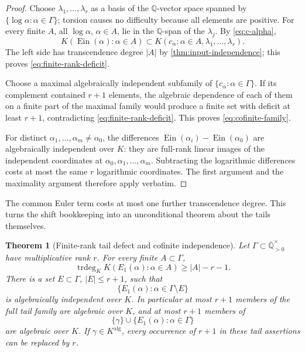 \documentclass[11pt]{article}
\newtheorem{theorem}{Theorem}[section]
\theoremstyle{definition}
\theoremstyle{remark}
\newcommand{\Q}{\mathbb Q}
\newcommand{\Qbar}{\overline{\mathbb Q}}
\newcommand{\Ein}{\operatorname{Ein}}
\newcommand{\trdeg}{\operatorname{trdeg}}
\begin{document}
\begin{proof}
Choose \(\lambda_1,\ldots,\lambda_r\) as a basis of the \(\Q\)-vector space
spanned by \(\{\log\alpha:\alpha\in\Gamma\}\); torsion causes no difficulty
because all elements are positive.  For every finite \(A\), all
\(\log\alpha\), \(\alpha\in A\), lie in the \(\Q\)-span of the
\(\lambda_j\).  By \eqref{eq:c-alpha},
\[
 K(\Ein(\alpha):\alpha\in A)
 \subset K(c_\alpha:\alpha\in A,\lambda_1,\ldots,\lambda_r).
\]
The left side has transcendence degree \(|A|\) by
\cref{thm:input-independence}; this proves \eqref{eq:finite-rank-deficit}.

Choose a maximal algebraically independent subfamily of
\(\{c_\alpha:\alpha\in\Gamma\}\).  If its complement contained
\(r+1\) elements, the algebraic dependence of each of them on a finite part
of the maximal family would produce a finite set with deficit at least
\(r+1\), contradicting \eqref{eq:finite-rank-deficit}.  This proves
\eqref{eq:cofinite-family}.

For distinct \(\alpha_1,\ldots,\alpha_m\ne\alpha_0\), the differences
\(\Ein(\alpha_i)-\Ein(\alpha_0)\) are algebraically independent over \(K\):
they are full-rank linear images of the independent coordinates at
\(\alpha_0,\alpha_1,\ldots,\alpha_m\).  Subtracting the logarithmic
differences costs at most the same \(r\) logarithmic coordinates.  The first
argument and the maximality argument therefore apply verbatim.
\end{proof}

The common Euler term costs at most one further transcendence degree.  This
turns the shift bookkeeping into an unconditional theorem about the tails
themselves.

\begin{theorem}[Finite-rank tail defect and cofinite independence]
\label{thm:E1-cofinite}
Let \(\Gamma\subset\Qbar_{>0}^{\times}\) have multiplicative rank \(r\).
For every finite \(A\subset\Gamma\),
\begin{equation}\label{eq:E1-finite-rank-defect}
 \boxed{\displaystyle
 \trdeg_KK(E_1(\alpha):\alpha\in A)\ge |A|-r-1.}
\end{equation}
There is a set \(E\subset\Gamma\), \(|E|\le r+1\), such that
\begin{equation}\label{eq:E1-cofinite}
 \{E_1(\alpha):\alpha\in\Gamma\setminus E\}
\end{equation}
is algebraically independent over \(K\).  In particular at most \(r+1\)
members of the full tail family are algebraic over \(K\), and at most
\(r+1\) members of
\[
 \{\gamma\}\cup\{E_1(\alpha):\alpha\in\Gamma\}
\]
are algebraic over \(K\).  If \(\gamma\in K^{\mathrm{alg}}\), every
occurrence of \(r+1\) in these tail assertions can be replaced by \(r\).
\end{theorem}
\end{document}
